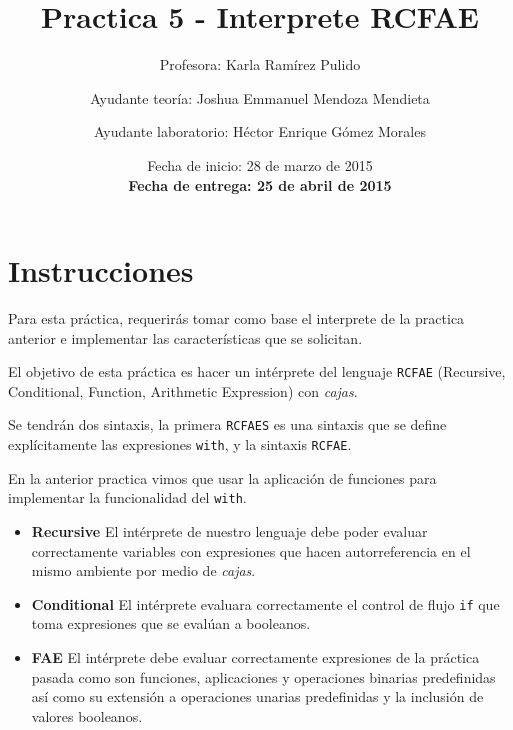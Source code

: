 \documentclass{article}
\author{Profesora: Karla Ramírez Pulido \and
  Ayudante teoría: Joshua Emmanuel Mendoza Mendieta \and
  Ayudante laboratorio: Héctor Enrique Gómez Morales}
\title{Practica 5 - Interprete RCFAE}
\date{Fecha de inicio: 28 de marzo de 2015\\
  \textbf{Fecha de entrega: 25 de abril de 2015}}
\begin{document}
\maketitle
\section{Instrucciones}

Para esta práctica, requerirás tomar como base el interprete de la practica anterior e implementar las características que se solicitan.

El objetivo de esta práctica es hacer un intérprete del lenguaje \texttt{RCFAE} (Recursive, Conditional, Function, Arithmetic Expression) con \emph{cajas}.

Se tendrán dos sintaxis, la primera \texttt{RCFAES} es una sintaxis que se define explícitamente las expresiones \texttt{with}, y la sintaxis \texttt{RCFAE}.

En la anterior practica vimos que usar la aplicación de funciones para implementar la funcionalidad del \texttt{with}.

\begin{itemize}
\item \textbf{Recursive} El intérprete de nuestro lenguaje debe poder evaluar correctamente variables con expresiones que hacen autorreferencia en el mismo ambiente por medio de \emph{cajas}.
\item \textbf{Conditional} El intérprete evaluara correctamente el control de flujo \texttt{if} que toma expresiones que se evalúan a booleanos.
\item \textbf{FAE} El intérprete debe evaluar correctamente expresiones de la práctica pasada como son funciones, aplicaciones y operaciones binarias predefinidas así como su extensión a operaciones unarias predefinidas y la inclusión de valores booleanos.
\end{itemize}
\end{document}
